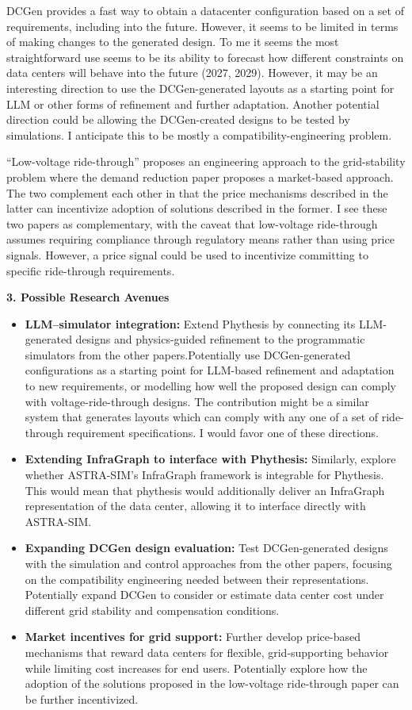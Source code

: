 \documentclass[10pt,a4paper]{article}
\newcommand{\heading}[1]{\vspace{3pt}\textbf{#1}\par}
\begin{document}
DCGen provides a fast way to obtain a datacenter configuration based on a set of requirements, including into the future. However, it seems to be limited in terms of making changes to the generated design. To me it seems the most straightforward use seems to be its ability to forecast how different constraints on data centers will behave into the future (2027, 2029). However, it may be an interesting direction to use the DCGen-generated layouts as a starting point for LLM or other forms of refinement and further adaptation. Another potential direction could be allowing the DCGen-created designs to be tested by simulations. I anticipate this to be mostly a compatibility-engineering problem.

``Low-voltage ride-through'' proposes an engineering approach to the grid-stability problem where the demand reduction paper proposes a market-based approach. The two complement each other in that the price mechanisms described in the latter can incentivize adoption of solutions described in the former. I see these two papers as complementary, with the caveat that low-voltage ride-through assumes requiring compliance through regulatory means rather than using price signals. However, a price signal could be used to incentivize committing to specific ride-through requirements.

\heading{3. Possible Research Avenues}
\begin{itemize}
    \item \textbf{LLM--simulator integration:} Extend Phythesis by connecting its LLM-generated designs and physics-guided refinement to the programmatic simulators from the other papers.Potentially use DCGen-generated configurations as a starting point for LLM-based refinement and adaptation to new requirements, or modelling how well the proposed design can comply with voltage-ride-through designs. The contribution might be a similar system that generates layouts which can comply with any one of a set of ride-through requirement specifications. I would favor one of these directions.
    \item \textbf{Extending InfraGraph to interface with Phythesis:} Similarly, explore whether ASTRA-SIM's InfraGraph framework is integrable for Phythesis. This would mean that phythesis would additionally deliver an InfraGraph representation of the data center, allowing it to interface directly with ASTRA-SIM.
    \item \textbf{Expanding DCGen design evaluation:} Test DCGen-generated designs with the simulation and control approaches from the other papers, focusing on the compatibility engineering needed between their representations. Potentially expand DCGen to consider or estimate data center cost under different grid stability and compensation conditions.
    \item \textbf{Market incentives for grid support:} Further develop price-based mechanisms that reward data centers for flexible, grid-supporting behavior while limiting cost increases for end users. Potentially explore how the adoption of the solutions proposed in the low-voltage ride-through paper can be further incentivized.
\end{itemize}
\end{document}
